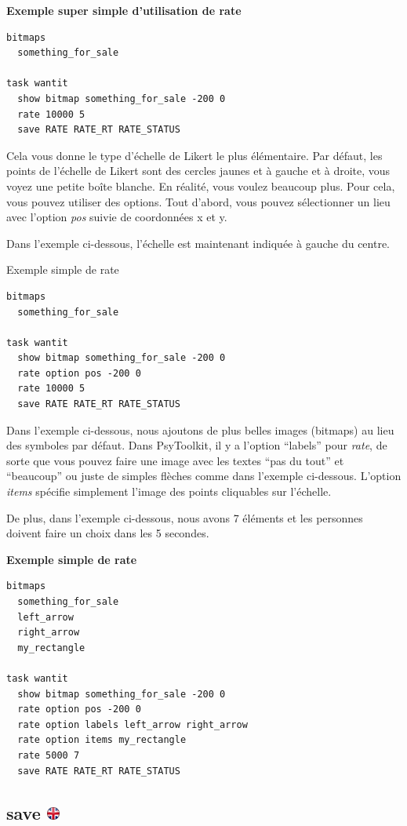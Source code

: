 \documentclass[
]{book}
\begin{document}
\textbf{Exemple super simple d'utilisation de rate}

\begin{verbatim}
bitmaps
  something_for_sale

task wantit
  show bitmap something_for_sale -200 0
  rate 10000 5
  save RATE RATE_RT RATE_STATUS
\end{verbatim}

Cela vous donne le type d'échelle de Likert le plus élémentaire. Par défaut, les points de l'échelle de Likert sont des cercles jaunes et à gauche et à droite, vous voyez une petite boîte blanche. En réalité, vous voulez beaucoup plus. Pour cela, vous pouvez utiliser des options. Tout d'abord, vous pouvez sélectionner un lieu avec l'option \emph{pos} suivie de coordonnées x et y.

Dans l'exemple ci-dessous, l'échelle est maintenant indiquée à gauche du centre.

Exemple simple de rate

\begin{verbatim}
bitmaps
  something_for_sale

task wantit
  show bitmap something_for_sale -200 0
  rate option pos -200 0
  rate 10000 5
  save RATE RATE_RT RATE_STATUS
\end{verbatim}

Dans l'exemple ci-dessous, nous ajoutons de plus belles images (bitmaps) au lieu des symboles par défaut. Dans PsyToolkit, il y a l'option ``labels'' pour \emph{rate}, de sorte que vous pouvez faire une image avec les textes ``pas du tout'' et ``beaucoup'' ou juste de simples flèches comme dans l'exemple ci-dessous. L'option \emph{items} spécifie simplement l'image des points cliquables sur l'échelle.

De plus, dans l'exemple ci-dessous, nous avons 7 éléments et les personnes doivent faire un choix dans les 5 secondes.

\textbf{Exemple simple de rate}

\begin{verbatim}
bitmaps
  something_for_sale
  left_arrow
  right_arrow
  my_rectangle

task wantit
  show bitmap something_for_sale -200 0
  rate option pos -200 0
  rate option labels left_arrow right_arrow
  rate option items my_rectangle
  rate 5000 7
  save RATE RATE_RT RATE_STATUS
\end{verbatim}

\hypertarget{save}{%
\subsection[save ]{\texorpdfstring{save \href{https://www.psytoolkit.org/doc3.2.0/syntax.html\#task-save}{\protect\includegraphics{img/ukflag.png}}}{save }}\label{save}}
\end{document}
